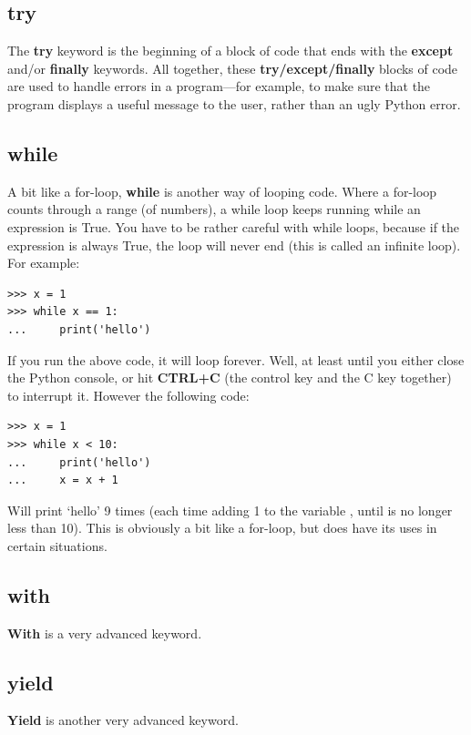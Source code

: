 \subsection*{try}

The \textbf{try} keyword is the beginning of a block of code that ends with the \textbf{except} and/or \textbf{finally} keywords.  All together, these \textbf{try/except/finally} blocks of code are used to handle errors in a program---for example, to make sure that the program displays a useful message to the user, rather than an ugly Python error.

\subsection*{while}

A bit like a for-loop, \textbf{while} is another way of looping code.  Where a for-loop counts through a range (of numbers), a while loop keeps running while an expression is True.  You have to be rather careful with while loops, because if the expression is always True, the loop will never end (this is called an infinite loop).  For example:

\begin{listingignore}
\begin{verbatim}
>>> x = 1
>>> while x == 1:
...     print('hello')
\end{verbatim}
\end{listingignore}

If you run the above code, it will loop forever.  Well, at least until you either close the Python console, or hit \textbf{CTRL+C} (the control key and the C key together) to interrupt it. However the following code:

\begin{listing}
\begin{verbatim}
>>> x = 1
>>> while x < 10:
...     print('hello')
...     x = x + 1
\end{verbatim}
\end{listing}

Will print `hello' 9 times (each time adding 1 to the variable , until  is no longer less than 10). This is obviously a bit like a for-loop, but does have its uses in certain situations.

\subsection*{with}

\textbf{With} is a very advanced keyword.

\subsection*{yield}
\textbf{Yield} is another very advanced keyword.

\newpage
